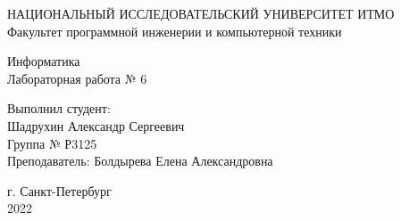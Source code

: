 \thispagestyle{empty}
   \begin{center}
      {\normalsize НАЦИОНАЛЬНЫЙ ИССЛЕДОВАТЕЛЬСКИЙ УНИВЕРСИТЕТ ИТМО\\
       Факультет программной инженерии и компьютерной техники}\\

      \vspace{20em}

     {\normalsize Информатика\\
      Лабораторная работа № 6}\\

     \vspace{20em}
   \end{center}
   \begin{flushright}
     Выполнил студент:\\
     Шадрухин Александр Сергеевич\\
     Группа № Р3125\\
     Преподаватель: Болдырева Елена Александровна\\
  \end{flushright}

    \vspace{20em}
 \begin{center}
   \footnotesize{г. Санкт-Петербург\\
    2022}
  \end{center}

